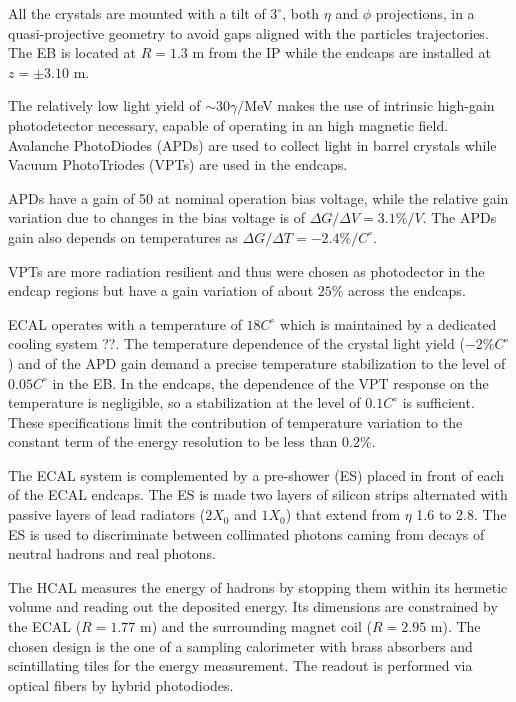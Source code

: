 All the crystals are mounted with a tilt of $3^{\circ}$, both $\eta$ and $\phi$ projections, in
a quasi-projective geometry to avoid gaps aligned with the particles trajectories. The EB
is located at $R = 1.3$ m from the IP while the endcaps are installed at $z = \pm 3.10$ m.

The relatively low light yield of $\sim 30 \gamma/$MeV makes the use of intrinsic high-gain
photodetector necessary, capable of operating in an high magnetic field. Avalanche PhotoDiodes (APDs) are
used to collect light in barrel crystals while Vacuum PhotoTriodes (VPTs) are used in the endcaps.

APDs have a gain of 50 at nominal operation bias voltage, while the relative gain variation due to changes in the bias voltage
is of $\Delta G/\Delta V = 3.1\% /V$. The APDs gain also depends on temperatures as
$\Delta G/\Delta T = -2.4\% /C^{\circ}$. 

VPTs are more radiation resilient and thus were chosen as photodector in the endcap regions
but have a gain variation of about $25\%$ across the endcaps.

ECAL operates with a temperature of $18 C^{\circ}$ which is maintained by a dedicated cooling system ??.
The temperature dependence of the crystal light yield ($−2\% C^{\circ}$) and of the APD gain
demand a precise temperature stabilization to the level of $0.05 C^{\circ}$ in the EB. In the
endcaps, the dependence of the VPT response on the temperature is negligible,
so a stabilization at the level of $0.1 C^{\circ}$ is sufficient. These specifications limit the contribution
of temperature variation to the constant term of the energy resolution to be less than 0.2$\%$.

The ECAL system is complemented by a pre-shower (ES) placed in front of each of the ECAL endcaps.
The ES is made two layers of silicon strips alternated with passive layers of lead radiators ($2 X_0$ and $1 X_0$)
that extend from $\eta$ 1.6 to 2.8.
The ES is used to discriminate between collimated photons caming from decays of neutral hadrons and
real photons.


The HCAL measures the energy of hadrons by stopping them within its
hermetic volume and reading out the deposited energy. Its dimensions
are constrained by the ECAL ($R = 1.77$ m) and the surrounding magnet coil
($R = 2.95$ m). The chosen design is the one of a sampling calorimeter with brass absorbers
and scintillating tiles for the energy measurement. The readout is performed via
optical fibers by hybrid photodiodes.

